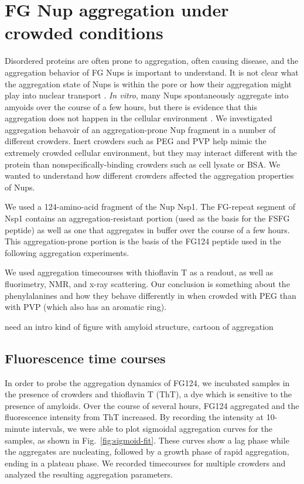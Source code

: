 \chapter{FG Nup aggregation under crowded conditions}\label{ch05}

Disordered proteins are often prone to aggregation, often causing disease, and the aggregation behavior of FG Nups is important to understand.  It is not clear what the aggregation state of Nups is within the pore or how their aggregation might play into nuclear transport \cite{things}.  \textit{In vitro}, many Nups spontaneously aggregate into amyoids over the course of a few hours, but there is evidence that this aggregation does not happen in the cellular environment \cite{frey07, Loren's paper}.  We investigated aggregation behavoir of an aggregation-prone Nup fragment in a number of different crowders.  Inert crowders such as PEG and PVP help mimic the extremely crowded cellular environment, but they may interact different with the protein than nonspecifically-binding crowders such as cell lysate or BSA.  We wanted to understand how different crowders affected the aggregation properties of Nups.

We used a 124-amino-acid fragment of the Nup Nsp1.  The FG-repeat segment of Nsp1 contains an aggregation-resistant portion (used as the basis for the FSFG peptide) as well as one that aggregates in buffer over the course of a few hours.  This aggregation-prone portion is the basis of the FG124 peptide used in the following aggregation experiments.

We used aggregation timecourses with thioflavin T as a readout, as well as fluorimetry, NMR, and x-ray scattering.  Our conclusion is something about the phenylalanines and how they behave differently in when crowded with PEG than with PVP (which also has an aromatic ring).

need an intro kind of figure with amyloid structure, cartoon of aggregation

\section{Fluorescence time courses}

In order to probe the aggregation dynamics of FG124, we incubated samples in the presence of crowders and thioflavin T (ThT), a dye which is sensitive to the presence of amyloids.  Over the course of several hours, FG124 aggregated and the fluorescence intensity from ThT increased.  By recording the intensity at 10-minute intervals, we were able to plot sigmoidal aggregation curves for the samples, as shown in Fig.~\ref{fig:sigmoid-fit}.  These curves show a lag phase while the aggregates are nucleating, followed by a growth phase of rapid aggregation, ending in a plateau phase.  We recorded timecourses for multiple crowders and analyzed the resulting aggregation parameters.

